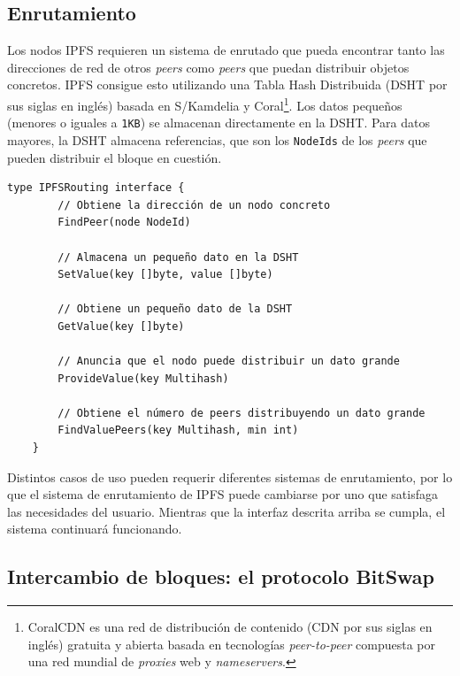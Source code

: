 \documentclass[12pt]{article} %
\begin{document}

\subsection{Enrutamiento} %
\label{sub:enrutamiento}

Los nodos IPFS requieren un sistema de enrutado que pueda encontrar tanto las direcciones de red de otros \textit{peers} como \textit{peers} que puedan distribuir objetos concretos. IPFS consigue esto utilizando una Tabla Hash Distribuida (DSHT por sus siglas en inglés) basada en S/Kamdelia y Coral\footnote{CoralCDN es una red de distribución de contenido (CDN por sus siglas en inglés) gratuita y abierta basada en tecnologías \textit{peer-to-peer} compuesta por una red mundial de \textit{proxies} web y \textit{nameservers}.}. Los datos pequeños (menores o iguales a \texttt{1KB}) se almacenan directamente en la DSHT. Para datos mayores, la DSHT almacena referencias, que son los \texttt{NodeIds} de los \textit{peers} que pueden distribuir el bloque en cuestión.

\begin{lstlisting}[caption={Interfaz de la DSHT.}, language=Golang]
	type IPFSRouting interface {
		// Obtiene la dirección de un nodo concreto
		FindPeer(node NodeId)

		// Almacena un pequeño dato en la DSHT
		SetValue(key []byte, value []byte)

		// Obtiene un pequeño dato de la DSHT
		GetValue(key []byte)

		// Anuncia que el nodo puede distribuir un dato grande
		ProvideValue(key Multihash)

		// Obtiene el número de peers distribuyendo un dato grande
		FindValuePeers(key Multihash, min int)
	}
\end{lstlisting}

Distintos casos de uso pueden requerir diferentes sistemas de enrutamiento, por lo que el sistema de enrutamiento de IPFS  puede cambiarse por uno que satisfaga las necesidades del usuario. Mientras que la interfaz descrita arriba se cumpla, el sistema continuará funcionando.


\subsection{Intercambio de bloques: el protocolo BitSwap} %
\label{sub:intercambio_de_bloques_el_protocolo_bitswap}
\end{document}
